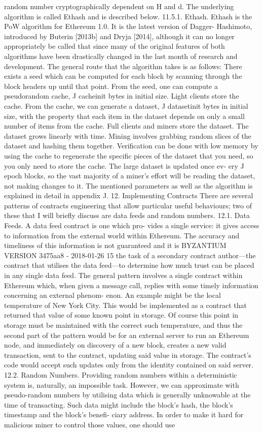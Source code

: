\documentclass[10pt,a4paper,leqno,bibliography=totoc]{scrartcl}
\newenvironment{alphafootnotes}
{\par\edef\savedfootnotenumber{\number\value{footnote}}
\renewcommand{\thefootnote}{\alph{footnote}}
\setcounter{footnote}{0}}
{\par\setcounter{footnote}{\savedfootnotenumber}}
\begin{document}
\begin{alphafootnotes}
\begin{multicols*}{2}
random number cryptographically dependent on H and d. The underlying algorithm is called Ethash and is described below. 11.5.1. Ethash. Ethash is the PoW algorithm for Ethereum 1.0. It is the latest version of Dagger- Hashimoto, introduced by Buterin [2013b] and Dryja [2014], although it can no longer appropriately be called that since many of the original features of both algorithms have been drastically changed in the last month of research and development. The general route that the algorithm takes is as follows: There exists a seed which can be computed for each block by scanning through the block headers up until that point. From the seed, one can compute a pseudorandom cache, J cacheinit bytes in initial size. Light clients store the cache. From the cache, we can generate a dataset, J datasetinit bytes in initial size, with the property that each item in the dataset depends on only a small number of items from the cache. Full clients and miners store the dataset. The dataset grows linearly with time. Mining involves grabbing random slices of the dataset and hashing them together. Verification can be done with low memory by using the cache to regenerate the specific pieces of the dataset that you need, so you only need to store the cache. The large dataset is updated once ev- ery J epoch blocks, so the vast majority of a miner’s effort will be reading the dataset, not making changes to it. The mentioned parameters as well as the algorithm is explained in detail in appendix J. 12. Implementing Contracts There are several patterns of contracts engineering that allow particular useful behaviours; two of these that I will briefly discuss are data feeds and random numbers. 12.1. Data Feeds. A data feed contract is one which pro- vides a single service: it gives access to information from the external world within Ethereum. The accuracy and timeliness of this information is not guaranteed and it is BYZANTIUM VERSION 3475aa8 - 2018-01-26 15 the task of a secondary contract author—the contract that utilises the data feed—to determine how much trust can be placed in any single data feed. The general pattern involves a single contract within Ethereum which, when given a message call, replies with some timely information concerning an external phenom- enon. An example might be the local temperature of New York City. This would be implemented as a contract that returned that value of some known point in storage. Of course this point in storage must be maintained with the correct such temperature, and thus the second part of the pattern would be for an external server to run an Ethereum node, and immediately on discovery of a new block, creates a new valid transaction, sent to the contract, updating said value in storage. The contract’s code would accept such updates only from the identity contained on said server. 12.2. Random Numbers. Providing random numbers within a deterministic system is, naturally, an impossible task. However, we can approximate with pseudo-random numbers by utilising data which is generally unknowable at the time of transacting. Such data might include the block’s hash, the block’s timestamp and the block’s benefi- ciary address. In order to make it hard for malicious miner to control those values, one should use 
\end{multicols*}
\end{alphafootnotes}
\end{document}

